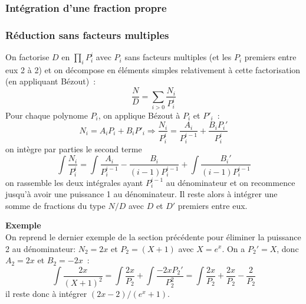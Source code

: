 \documentclass[a4paper,11pt]{article}
\begin{document}
\subsubsection{Intégration d'une fraction propre}
\subsubsection{Réduction sans facteurs multiples}
On factorise $D$ en $\prod_i P_i^i$ avec $P_i$ sans facteurs multiples 
(et les $P_i$ premiers entre eux 2 \`a 2) et on décompose
en éléments simples relativement à cette factorisation (en appliquant
Bézout)~:
\[ \frac{N}{D} = \sum_{i>0} \frac{N_i}{P_i^i} \]
Pour chaque polynome $P_i$, on applique Bézout à $P_i$ et $P'_i$~:
\[ N_i = A_iP_i+B_iP'_i \Rightarrow \frac{N_i}{P_i^i}=\frac{A_i}{P_i^{i-1}}
+ \frac{B_iP_i'}{P_i^i}\]
on intègre par parties le second terme
\[ \int \frac{N_i}{P_i^i} = \int \frac{A_i}{P_i^{i-1}}
- \frac{B_i}{(i-1)P_i^{i-1}} + \int \frac{B_i'}{(i-1)P_i^{i-1}}  \]
on rassemble les deux int\'egrales ayant $P_i^{i-1}$ au dénominateur
et on recommence jusqu'à avoir une puissance 1 au dénominateur. Il reste
alors \`a int\'egrer une somme de fractions du type $N/D$ avec
$D$ et $D'$ premiers entre eux.

{\bf Exemple}\\
On reprend le dernier exemple de la section précédente pour
éliminer la puissance 2 au dénominateur:
$N_2=2x$ et $P_2=(X+1)$ avec $X=e^x$. On a $P_2'=X$, donc $A_2=2x$ et
$B_2=-2x$~:
\[ \int \frac{2x}{(X+1)^2} =\int \frac{2x}{P_2} + 
\int \frac{-2x P_2'}{P_2^2} = \int \frac{2x}{P_2} + \frac{2x}{P_2}
- \frac{2}{P_2}\]
il reste donc à intégrer $(2x-2)/(e^x+1)$.
\end{document}
